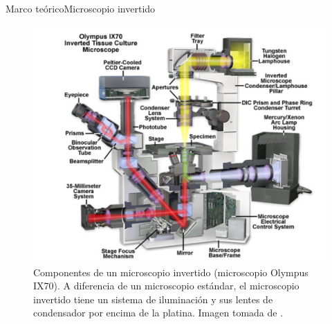 \documentclass[10pt,aspectratio=1610,compress,dvipsnames]{beamer}
\begin{document}
\begin{frame}{Marco teórico}{Microscopio invertido}

\begin{figure}
    \centering
    \includegraphics[scale=0.3]{Microscopeinvertedtrain.png}
    \caption{Componentes de un microscopio invertido (microscopio Olympus IX70). A diferencia de un microscopio estándar, el microscopio invertido tiene un sistema de iluminación y sus lentes de condensador por encima de la platina. Imagen tomada de \cite{Fester_Davidson_Abramowitz}. \label{FluorescenceM}}
    \label{Microscope inverted}
\end{figure}


\end{frame}
\end{document}
